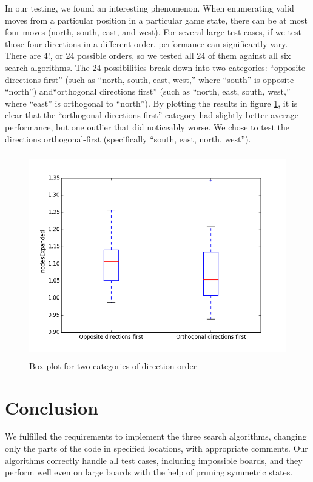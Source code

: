 \documentclass[11pt]{article}
\begin{document}
In our testing, we found an interesting phenomenon. When enumerating valid moves
from a particular position in a particular game state, there can be at most four
moves (north, south, east, and west). For several large test cases, if we test
those four directions in a different order, performance can significantly vary.
There are $4!$, or 24 possible orders, so we tested all 24 of them against all
six search algorithms. The 24 possibilities break down into two categories:
``opposite directions first'' (such as ``north, south, east, west,'' where
``south'' is opposite ``north'') and``orthogonal directions first'' (such as
``north, east, south, west,'' where ``east'' is orthogonal to ``north''). By
plotting the results in figure \ref{fig_dir_order}, it is clear that the
``orthogonal directions first'' category had slightly better average
performance, but one outlier that did noticeably worse. We chose to test the
directions orthogonal-first (specifically ``south, east, north, west'').

\begin{figure}[h!]
\centering
\includegraphics[height=3.5in, width=4.5in]{figs/boxplot.png}
\caption{Box plot for two categories of direction order}
\label{fig_dir_order}
\end{figure}

\section{Conclusion}

We fulfilled the requirements to implement the three search algorithms, changing
only the parts of the code in specified locations, with appropriate comments.
Our algorithms correctly handle all test cases, including impossible boards, and
they perform well even on large boards with the help of pruning symmetric states.
\end{document}
